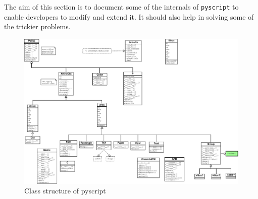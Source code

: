 \documentclass[a4paper]{book}
\begin{document}
The aim of this section is to document some of the internals of
\Verb|pyscript| to enable developers to modify and extend it. 
It should also help in solving some of the trickier problems.

\begin{figure}[h]
  \begin{center}
    \begin{sideways}
      \includegraphics[height=.9\textwidth]{class_structure}
    \end{sideways}
  \end{center}
  \caption{Class structure of pyscript}
  \label{fig:classes}
\end{figure}
\end{document}
